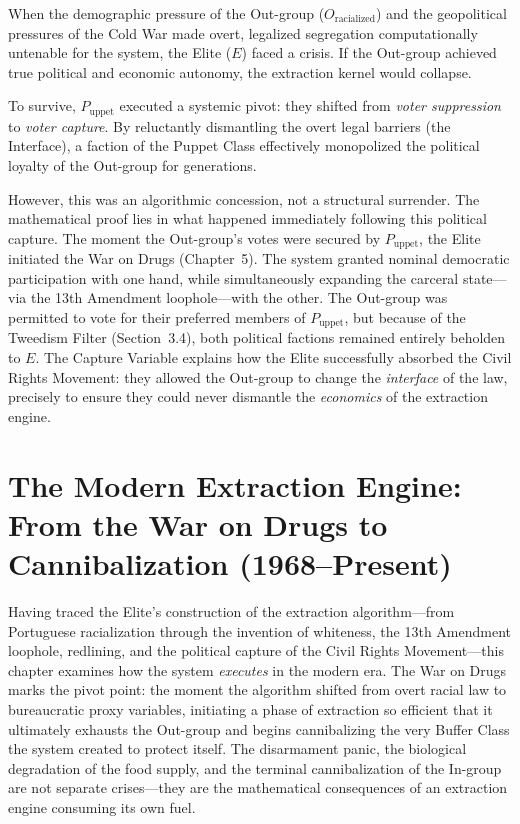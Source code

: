 \documentclass[12pt,openany]{book}
\begin{document}
When the demographic pressure of the Out-group ($O_{\text{racialized}}$) and the geopolitical pressures of the Cold War made overt, legalized segregation computationally untenable for the system, the Elite ($E$) faced a crisis. If the Out-group achieved true political and economic autonomy, the extraction kernel would collapse.

To survive, $P_{\text{uppet}}$ executed a systemic pivot: they shifted from \textit{voter suppression} to \textit{voter capture}. By reluctantly dismantling the overt legal barriers (the Interface), a faction of the Puppet Class effectively monopolized the political loyalty of the Out-group for generations.

However, this was an algorithmic concession, not a structural surrender. The mathematical proof lies in what happened immediately following this political capture. The moment the Out-group's votes were secured by $P_{\text{uppet}}$, the Elite initiated the War on Drugs (Chapter~5). The system granted nominal democratic participation with one hand, while simultaneously expanding the carceral state---via the 13th Amendment loophole---with the other. The Out-group was permitted to vote for their preferred members of $P_{\text{uppet}}$, but because of the Tweedism Filter (Section~3.4), both political factions remained entirely beholden to $E$. The Capture Variable explains how the Elite successfully absorbed the Civil Rights Movement: they allowed the Out-group to change the \textit{interface} of the law, precisely to ensure they could never dismantle the \textit{economics} of the extraction engine.

\chapter{The Modern Extraction Engine: From the War on Drugs to Cannibalization (1968--Present)}

Having traced the Elite's construction of the extraction algorithm---from Portuguese racialization through the invention of whiteness, the 13th Amendment loophole, redlining, and the political capture of the Civil Rights Movement---this chapter examines how the system \textit{executes} in the modern era. The War on Drugs marks the pivot point: the moment the algorithm shifted from overt racial law to bureaucratic proxy variables, initiating a phase of extraction so efficient that it ultimately exhausts the Out-group and begins cannibalizing the very Buffer Class the system created to protect itself. The disarmament panic, the biological degradation of the food supply, and the terminal cannibalization of the In-group are not separate crises---they are the mathematical consequences of an extraction engine consuming its own fuel.
\end{document}
